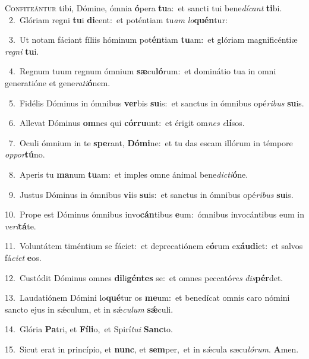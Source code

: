 \lettrine{\initial\textcolor{\initialcolor}{C}}{onfiteántur} tibi, Dómine, ómnia \textbf{ó}\-pera \textbf{tu}\-a:~\star et sancti tui bene\-\textit{dí}\-\textit{cant} \textbf{ti}\-bi.\\
{\numbfont\textcolor{\numbcolor}{~2.}}~Glóriam regni \textbf{tu}\-i \textbf{di}\-cent:~\star et poténtiam tu\textit{am} \textit{lo}\-\textbf{quén}tur:\par
{\numbfont\textcolor{\numbcolor}{~3.}}~Ut notam fáciant fíliis hóminum pot\-\textbf{én}\-tiam \textbf{tu}\-am:~\star et glóriam magnificéntiæ \textit{re}\-\textit{gni} \textbf{tu}\-i.\par
{\numbfont\textcolor{\numbcolor}{~4.}}~Regnum tuum regnum ómnium \textbf{sæ}\-cu\-\textbf{ló}\-rum:~\star et dominátio tua in omni generatióne et gene\-\textit{ra}\-\textit{ti}\textbf{ó}nem.\par
{\numbfont\textcolor{\numbcolor}{~5.}}~Fidélis Dóminus in ómnibus \textbf{ver}\-bis \textbf{su}\-is:~\star et sanctus in ómnibus opé\-\textit{ri}\-\textit{bus} \textbf{su}\-is.\par
{\numbfont\textcolor{\numbcolor}{~6.}}~Allevat Dóminus \textbf{om}\-nes qui \textbf{cór}\-\textbf{ru}unt:~\star et érigit om\textit{nes} \textit{e}\-\textbf{lí}sos.\par
{\numbfont\textcolor{\numbcolor}{~7.}}~Oculi ómnium in te \textbf{spe}\-rant, \textbf{Dó}\-\textbf{mi}ne:~\star et tu das escam illórum in témpore \textit{op}\-\textit{por}\textbf{tú}no.\par
{\numbfont\textcolor{\numbcolor}{~8.}}~Aperis tu \textbf{ma}\-num \textbf{tu}\-am:~\star et imples omne ánimal bene\-\textit{dic}\-\textit{ti}\textbf{ó}ne.\par
{\numbfont\textcolor{\numbcolor}{~9.}}~Justus Dóminus in ómnibus \textbf{vi}\-is \textbf{su}\-is:~\star et sanctus in ómnibus opé\-\textit{ri}\-\textit{bus} \textbf{su}\-is.\par
{\numbfont\textcolor{\numbcolor}{10.}}~Prope est Dóminus ómnibus invo\-\textbf{cán}\-tibus \textbf{e}\-um:~\star ómnibus invocántibus eum in \textit{ve}\-\textit{ri}\textbf{tá}te.\par
{\numbfont\textcolor{\numbcolor}{11.}}~Voluntátem timéntium se fáciet:~\dagger et deprecatiónem e\-\textbf{ó}\-rum ex\-\textbf{áu}\-\textbf{di}et:~\star et salvos fá\-\textit{ci}\-\textit{et} \textbf{e}\-os.\par
{\numbfont\textcolor{\numbcolor}{12.}}~Custódit Dóminus omnes \textbf{di}\-li\-\textbf{gén}\-\textbf{tes} se:~\star et omnes peccató\textit{res} \textit{dis}\-\textbf{pér}det.\par
{\numbfont\textcolor{\numbcolor}{13.}}~Laudatiónem Dómini lo\-\textbf{qué}\-tur os \textbf{me}\-um:~\star et benedícat omnis caro nómini sancto ejus in sǽculum, et in sǽ\-\textit{cu}\-\textit{lum} \textbf{sǽ}\-culi.\par
{\numbfont\textcolor{\numbcolor}{14.}}~Glória \textbf{Pa}\-tri, et \textbf{Fí}\-\textbf{li}o,~\star et Spirí\-\textit{tu}\-\textit{i} \textbf{Sanc}\-to.\par
{\numbfont\textcolor{\numbcolor}{15.}}~Sicut erat in princípio, et \textbf{nunc}\-, et \textbf{sem}\-per,~\star et in sǽcula sæcu\-\textit{ló}\-\textit{rum}. \textbf{A}\-men.\par
